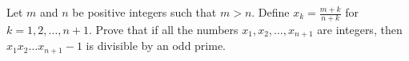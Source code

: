 Let 
$m$
 and 
$n$
 be positive integers such that 
$m>n$.
 Define 
$x_k=\frac{m+k}{n+k}$
 for 
$k=1,2,\ldots,n+1$.
 Prove that if all the numbers 
$x_1,x_2,\ldots,x_{n+1}$
 are integers, then 
$x_1x_2\ldots x_{n+1}-1$
 is divisible by an odd prime.
